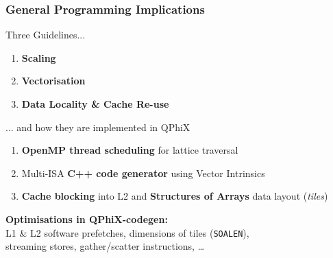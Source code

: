 \documentclass{beamer}
\begin{document}

  \begin{frame}
    \frametitle{General Programming Implications}

    Three Guidelines...
    \begin{enumerate}
      \item \textbf{Scaling}
      \item \textbf{Vectorisation}
      \item \textbf{Data Locality \& Cache Re-use}
    \end{enumerate}
    \vfill

    ... and how they are implemented in QPhiX
    \begin{enumerate}
      \item \textbf{OpenMP thread scheduling} for lattice traversal
      \item Multi-ISA \textbf{C++ code generator} using Vector Intrinsics
      \item \textbf{Cache blocking} into L2 and \textbf{Structures of Arrays} data layout (\textit{tiles})
    \end{enumerate}
    \vfill

    \textbf{Optimisations in QPhiX-codegen:}\\
    L1 \& L2 software prefetches,
    dimensions of tiles (\texttt{SOALEN}),\\
    streaming stores, gather/scatter instructions, \dots

  \end{frame}

\end{document}
